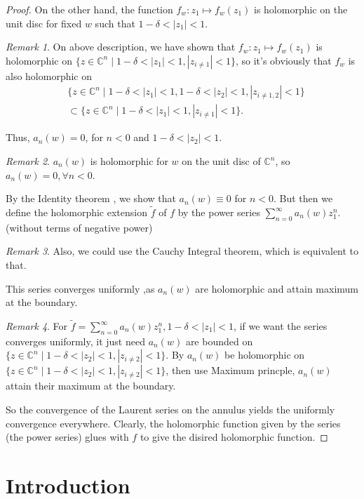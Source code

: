 \documentclass[12pt,twoside]{book}
\theoremstyle{plain}
\theoremstyle{definition}
\theoremstyle{remark}
\newtheorem{remark}[remark]{Remark}
\numberwithin{equation}{section}
\begin{document}
\begin{proof}
    On the other hand, the function $f_w\colon z_1\mapsto f_w(z_1)$ is holomorphic on the unit disc for fixed $w$ such that $1-\delta<|z_1|<1$. 
    \begin{remark}
        On above description, we have shown that $f_w\colon z_1\mapsto f_w(z_1)$ is holomorphic on $\{z\in\mathbb{C}^n\mid 1-\delta<|z_1|<1,|z_{i\neq 1}|<1\}$, so it's obviously that $f_w$ is also holomorphic on 
        \begin{align*}
        &\{z\in\mathbb{C}^n\mid 1-\delta<|z_1|<1,1-\delta<|z_2|<1,|z_{i\neq 1,2}|<1\}\\
        &\subset \{z\in\mathbb{C}^n\mid 1-\delta<|z_1|<1,|z_{i\neq 1}|<1\}. \end{align*}
    \end{remark}
    Thus, $a_n (w)=0$, for $n<0$ and $1-\delta<|z_2|<1$. 
    \begin{remark}
        $a_n(w)$ is holomorphic for $w$ on the unit disc of $\mathbb{C}^n$, so $a_n (w)=0, \forall n<0$. 
    \end{remark}
    By the Identity theorem , we show that $a_n(w)\equiv 0$ for $n<0$. But then we define the holomorphic extension $\widetilde{f}$ of $f$ by the power series $\sum_{n=0}^{\infty}a_n (w)z_1^n$. (without terms of negative power)
    \begin{remark}
        Also, we could use the Cauchy Integral theorem, which is equivalent to that.
    \end{remark}
    This series converges uniformly ,as $a_n (w)$ are holomorphic and attain maximum at the boundary. 
    \begin{remark}
        For $\widetilde{f}=\sum_{n=0}^{\infty}a_n(w)z_1^n, 1-\delta<|z_1|<1$, if we want the series converges uniformly, it just need $a_n(w)$ are bounded on $\{z\in\mathbb{C}^n\mid 1-\delta<|z_2|<1,|z_{i\neq 2}|<1\}$. By $a_n(w)$ be holomorphic on $\{z\in\mathbb{C}^n\mid 1-\delta<|z_2|<1,|z_{i\neq 2}|<1\}$, then use Maximum princple, $a_n(w)$ attain their maximum at the boundary.
        \end{remark}
        So the convergence of the Laurent series on the annulus yields the uniformly convergence everywhere. Clearly, the holomorphic function given by the series (the power series) glues with $f$ to give the disired holomorphic function.
\end{proof}
 
\section{\bf Introduction}
\end{document}
